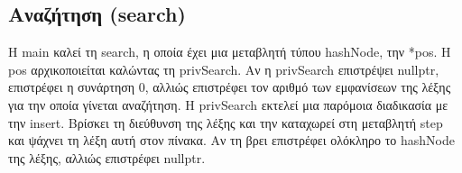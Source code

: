 \subsection{Aναζήτηση (search)}

Η main καλεί τη search, η οποία έχει μια μεταβλητή τύπου hashNode, την *pos. Η pos αρχικοποιείται καλώντας τη privSearch. Αν η privSearch επιστρέψει nullptr, επιστρέφει η συνάρτηση 0, αλλιώς επιστρέφει τον αριθμό των εμφανίσεων της λέξης για την οποία γίνεται αναζήτηση.
Η privSearch εκτελεί μια παρόμοια διαδικασία με την insert. Βρίσκει τη διεύθυνση της λέξης και την καταχωρεί στη μεταβλητή step και ψάχνει τη λέξη αυτή στον πίνακα. Αν τη βρει επιστρέφει ολόκληρο το hashNode της λέξης, αλλιώς επιστρέφει nullptr.



